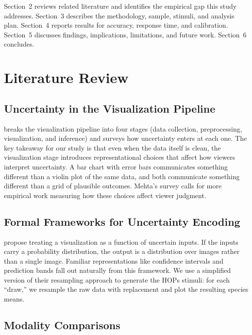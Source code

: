 \documentclass{article}
\begin{document}
Section~2 reviews related literature and identifies the empirical gap
this study addresses.  Section~3 describes the methodology, sample,
stimuli, and analysis plan.  Section~4 reports results for accuracy,
response time, and calibration.  Section~5 discusses findings,
implications, limitations, and future work.  Section~6 concludes.

\section{Literature Review}

\subsection{Uncertainty in the Visualization Pipeline}

\textcite{mehta2022} breaks the visualization pipeline into four stages
(data collection, preprocessing, visualization, and inference) and
surveys how uncertainty enters at each one.  The key takeaway for our
study is that even when the data itself is clean, the visualization
stage introduces representational choices that affect how viewers
interpret uncertainty.  A bar chart with error bars communicates
something different than a violin plot of the same data, and both
communicate something different than a grid of plausible outcomes.
Mehta's survey calls for more empirical work measuring how these
choices affect viewer judgment.

\subsection{Formal Frameworks for Uncertainty Encoding}

\textcite{petek2025} propose treating a visualization as a function of
uncertain inputs.  If the inputs carry a probability distribution, the
output is a distribution over images rather than a single image.
Familiar representations like confidence intervals and prediction bands
fall out naturally from this framework.  We use a simplified version of
their resampling approach to generate the HOPs stimuli: for each
``draw,'' we resample the raw data with replacement and plot the
resulting species means.

\subsection{Modality Comparisons}
\end{document}
